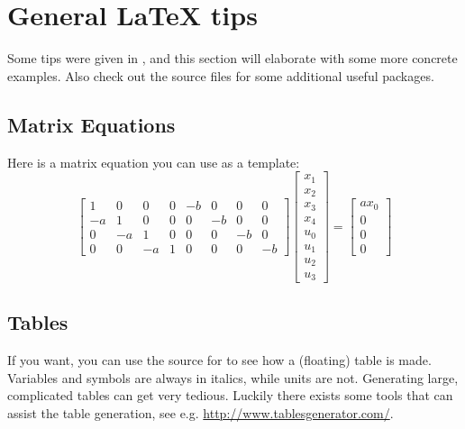 \newcommand{\texMacro}[2]{\texttt{\textbackslash{#1}\{#2\}}}
\section{General LaTeX tips}\label{sec:latex_tips}
Some tips were given in , and this section will elaborate with some more concrete examples. Also check out the source files for some additional useful packages.

\subsection{Matrix Equations}
Here is a matrix equation you can use as a template:
\begin{equation}
	\begin{bmatrix}
		1 &  0 &  0 & 0 & -b &  0 &  0 &  0 \\
		-a &  1 &  0 & 0 &  0 & -b &  0 &  0 \\
		0 & -a &  1 & 0 &  0 &  0 & -b &  0 \\
		0 &  0 & -a & 1 &  0 &  0 &  0 & -b                                
	\end{bmatrix}
	\begin{bmatrix} x_1 \\ x_2 \\ x_3 \\ x_4 \\ u_0 \\ u_1 \\ u_2 \\ u_3 \end{bmatrix}
	=
	\begin{bmatrix}
		ax_0 \\ 0 \\ 0 \\ 0      
	\end{bmatrix}
\end{equation}

\subsection{Tables}
If you want, you can use the source for  to see how a (floating) table is made. Variables and symbols are always in italics, while units are not. Generating large, complicated tables can get very tedious. Luckily there exists some tools that can assist the table generation, see e.g. \url{http://www.tablesgenerator.com/}.



